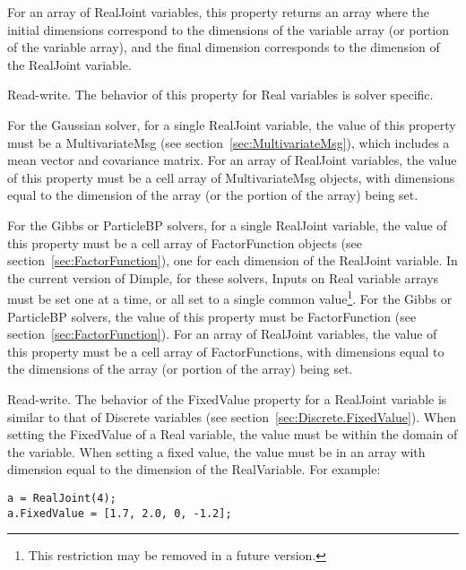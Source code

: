 \ifmatlab
For an array of RealJoint variables, this property returns an array where the initial dimensions correspond to the dimensions of the variable array (or portion of the variable array), and the final dimension corresponds to the dimension of the RealJoint variable.
\fi

\label{sec:RealJoint.Input}

Read-write.  The behavior of this property for Real variables is solver specific.  

For the Gaussian solver, \ifmatlab for a single RealJoint variable, \fi the value of this property must be a MultivariateMsg (see section~\ref{sec:MultivariateMsg}), which includes a mean vector and covariance matrix.  \ifmatlab For an array of RealJoint variables, the value of this property must be a cell array of MultivariateMsg objects, with dimensions equal to the dimension of the array (or the portion of the array) being set. \fi

\ifmatlab
For the Gibbs or ParticleBP solvers, for a single RealJoint variable, the value of this property must be a cell array of FactorFunction objects (see section~\ref{sec:FactorFunction}), one for each dimension of the RealJoint variable.  In the current version of Dimple, for these solvers, Inputs on Real variable arrays must be set one at a time, or all set to a single common value\footnote{This restriction may be removed in a future version.}.
\fi
\ifjava
For the Gibbs or ParticleBP solvers, the value of this property must be FactorFunction (see section~\ref{sec:FactorFunction}).  For an array of RealJoint variables, the value of this property must be a cell array of FactorFunctions, with dimensions equal to the dimensions of the array (or portion of the array) being set.
\fi

\label{sec:RealJoint.FixedValue}

Read-write.  The behavior of the FixedValue property for a RealJoint variable is similar to that of Discrete variables (see section~\ref{sec:Discrete.FixedValue}).  When setting the FixedValue of a Real variable, the value must be within the domain of the variable.  When setting a fixed value, the value must be in an array with dimension equal to the dimension of the RealVariable.  For example:

\ifmatlab
\begin{lstlisting}
a = RealJoint(4);
a.FixedValue = [1.7, 2.0, 0, -1.2];
\end{lstlisting}
\fi

